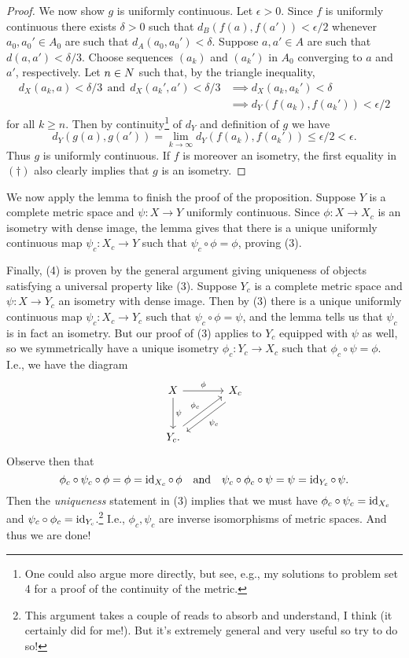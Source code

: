 \begin{proof}
  We now show $g$ is uniformly continuous. Let $\epsilon > 0$. Since
  $f$ is uniformly continuous there exists $\delta > 0$ such that
  $d_B(f(a),f(a')) < \epsilon/2$ whenever $a_0,a_0' \in A_0$ are such
  that $d_A(a_0,a_0') < \delta$. Suppose $a,a' \in A$ are such that
  $d(a,a') < \delta/3$. Choose sequences $(a_k)$ and $(a_k')$ in $A_0$
  converging to $a$ and $a'$, respectively. Let $n \in N$ such that,
  by the triangle inequality,
  \begin{align*}
  d_X(a_k,a) < \delta/3\ \ \text{and}\ \ d_X(a_k',a') < \delta/3
  &\implies d_X(a_k,a_k') < \delta \\ &\implies d_Y(f(a_k),f(a_k')) <
  \epsilon/2
  \end{align*}
  for all $k \ge n$. Then by continuity\footnote{One could also argue
    more directly, but see, e.g., my solutions to problem set 4 for a
    proof of the continuity of the metric.} of $d_Y$ and definition of
  $g$ we have
  \begin{equation}
    \tag{$\dagger$} d_Y(g(a),g(a')) = \lim_{k \to \infty}
    d_Y(f(a_k),f(a_k')) \le \epsilon/2 < \epsilon.
  \end{equation}
  Thus $g$ is uniformly continuous. If $f$ is moreover an isometry,
  the first equality in $(\dagger)$ also clearly implies that $g$ is
  an isometry.
\end{proof}

We now apply the lemma to finish the proof of the proposition. Suppose
$Y$ is a complete metric space and $\psi : X \to Y$ uniformly
continuous. Since $\phi : X \to X_c$ is an isometry with dense image,
the lemma gives that there is a unique uniformly continuous map
$\psi_c : X_c \to Y$ such that $\psi_c \circ \phi = \phi$, proving
(3).

Finally, (4) is proven by the general argument giving uniqueness of
objects satisfying a universal property like (3). Suppose $Y_c$ is a
complete metric space and $\psi : X \to Y_c$ an isometry with dense
image. Then by (3) there is a unique uniformly continuous map $\psi_c
: X_c \to Y_c$ such that $\psi_c \circ \phi = \psi$, and the lemma
tells us that $\psi_c$ is in fact an isometry. But our proof of (3)
applies to $Y_c$ equipped with $\psi$ as well, so we symmetrically
have a unique isometry $\phi_c : Y_c \to X_c$ such that $\phi_c \circ
\psi = \phi$. I.e., we have the diagram
\[
\begin{tikzcd}[column sep = large, row sep = large]
  X \rar{\phi} \dar{\psi} & X_c \ar[shift left = .7ex]{dl}{\psi_c}
  \\ Y_c \ar[shift left = .7ex]{ur}{\phi_c}.
\end{tikzcd}
\]
Observe then that
\[
\phi_c \circ \psi_c \circ \phi = \phi = \operatorname{id}_{X_c} \circ\, \phi
\quad\text{and}\quad \psi_c \circ \phi_c \circ \psi = \psi = \operatorname{id}_{Y_c}
\circ\, \psi.
\]
Then the \textit{uniqueness} statement in (3) implies that we must
have $\phi_c \circ \psi_c = \operatorname{id}_{X_c}$ and $\psi_c \circ \phi_c =
\operatorname{id}_{Y_c}$.\footnote{This argument takes a couple of reads to absorb
  and understand, I think (it certainly did for me!). But it's
  extremely general and very useful so try to do so!} I.e.,
$\phi_c,\psi_c$ are inverse isomorphisms of metric spaces. And thus we
are done!



